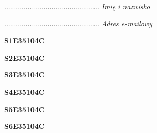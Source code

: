 \begin{turn}{90}\begin{minipage}{\linewidth} \vspace{20mm} ................................................  \textit{Imię i nazwisko}\end{minipage}\end{turn}

\begin{turn}{90}\begin{minipage}{\linewidth} \vspace{20mm} ................................................  \textit{Adres e-mailowy}\end{minipage}\end{turn}

\begin{turn}{90}\huge \begin{minipage}{\linewidth} \vspace{10mm}\textbf{S1E35104C}\end{minipage}\end{turn}

\begin{turn}{90}\huge \begin{minipage}{\linewidth} \vspace{10mm}\textbf{S2E35104C}\end{minipage}\end{turn}

\begin{turn}{90}\huge \begin{minipage}{\linewidth} \vspace{10mm}\textbf{S3E35104C}\end{minipage}\end{turn}

\begin{turn}{90}\huge \begin{minipage}{\linewidth} \vspace{10mm}\textbf{S4E35104C}\end{minipage}\end{turn}

\begin{turn}{90}\huge \begin{minipage}{\linewidth} \vspace{10mm}\textbf{S5E35104C}\end{minipage}\end{turn}

\begin{turn}{90}\huge \begin{minipage}{\linewidth} \vspace{10mm}\textbf{S6E35104C}\end{minipage}\end{turn}

